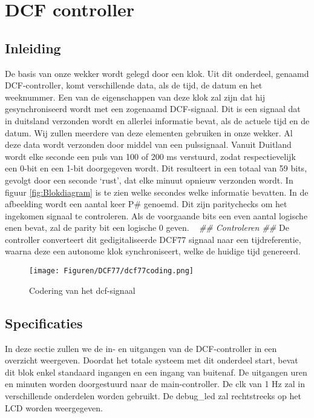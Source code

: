 \chapter{DCF controller}
\section{Inleiding}
De basis van onze wekker wordt gelegd door een klok. Uit dit onderdeel, genaamd DCF-controller,  komt verschillende data, als de tijd, de datum en het weeknummer. Een van de eigenschappen van deze klok zal zijn dat hij gesynchroniseerd wordt met een zogenaamd DCF-signaal. Dit is een signaal dat in duitsland verzonden wordt en allerlei informatie bevat, als de actuele tijd en de datum. Wij zullen meerdere van deze elementen gebruiken in onze wekker.  Al deze data wordt verzonden door middel van een pulssignaal. Vanuit Duitland wordt elke seconde een puls van 100 of 200 ms verstuurd, zodat respectievelijk een 0-bit en een 1-bit doorgegeven wordt. Dit resulteert in een totaal van 59 bits, gevolgt door een seconde ‘rust’, dat elke minuut opnieuw verzonden wordt. In figuur \ref{fig:Blokdiagram} is te zien welke secondes welke informatie bevatten. In de afbeelding wordt een aantal keer P\# genoemd. Dit zijn paritychecks om het ingekomen signaal te controleren. Als de voorgaande bits een even aantal logische enen bevat, zal de parity bit een logische 0 geven. ~\cite{Tijdscodering} \emph{\color{red} \#\# Controleren \#\#} De controller converteert dit gedigitaliseerde DCF77 signaal naar een tijdreferentie, waarna deze een autonome klok synchroniseert, welke de huidige tijd genereerd.

\begin{figure}[h!]
\center
\texttt{[image: Figuren/DCF77/dcf77coding.png]}
\caption{Codering van het dcf-signaal~\cite{Tijdscodering}}
\label{fig:dcfsignaal}
\end{figure}

\section{Specificaties}
In deze sectie zullen we de in- en uitgangen van de DCF-controller in een overzicht weergeven. Doordat het totale systeem met dit onderdeel start, bevat dit blok enkel standaard ingangen en een ingang van buitenaf. De uitgangen uren en minuten worden doorgestuurd naar de main-controller. De clk van 1 Hz zal in verschillende onderdelen worden gebruikt. De debug\_led zal rechtstreeks op het LCD worden weergegeven. 
